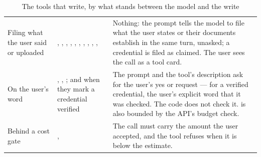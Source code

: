 \begin{table}[H]
\caption{The tools that write, by what stands between the model and the write}\label{tab:chat:writes}
\begin{tabularx}{\textwidth}{@{}L{40mm}YL{43mm}@{}}
\toprule
{} &  &  \\
\midrule
Filing what the user said or uploaded & , , , , , , , , , ,  & Nothing: the prompt tells the model to file what the user states or their documents establish in the same turn, unasked; a credential is filed as claimed. The user sees the call as a tool card. \\
On the user's word & , , ;  and  when they mark a credential verified & The prompt and the tool's description ask for the user's yes or request --- for a verified credential, the user's explicit word that it was checked. The code does not check it.  is also bounded by the API's budget check. \\
Behind a cost gate & ,  & The call must carry the amount the user accepted, and the tool refuses when it is below the estimate. \\
\bottomrule
\end{tabularx}
\end{table}

